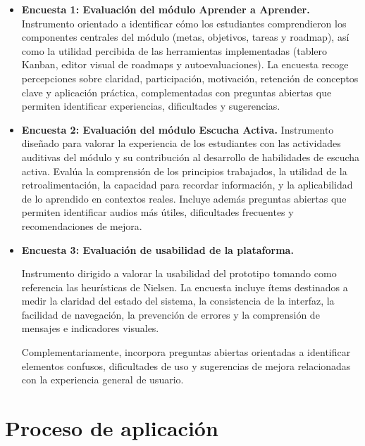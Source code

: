 \begin{itemize}
    \item \textbf{Encuesta 1: Evaluación del módulo Aprender a Aprender.}  
    Instrumento orientado a identificar cómo los estudiantes comprendieron los componentes centrales del módulo (metas, objetivos, tareas y roadmap), así como la utilidad percibida de las herramientas implementadas (tablero Kanban, editor visual de roadmaps y autoevaluaciones).
    La encuesta recoge percepciones sobre claridad, participación, motivación, retención de conceptos clave y aplicación práctica, complementadas con preguntas abiertas que permiten identificar experiencias, dificultades y sugerencias.


    \item \textbf{Encuesta 2: Evaluación del módulo Escucha Activa.}  
    Instrumento diseñado para valorar la experiencia de los estudiantes con las actividades auditivas del módulo y su contribución al desarrollo de habilidades de escucha activa.
    Evalúa la comprensión de los principios trabajados, la utilidad de la retroalimentación, la capacidad para recordar información, y la aplicabilidad de lo aprendido en contextos reales.
    Incluye además preguntas abiertas que permiten identificar audios más útiles, dificultades frecuentes y recomendaciones de mejora.


    \item \textbf{Encuesta 3: Evaluación de usabilidad de la plataforma.}  
    
    Instrumento dirigido a valorar la usabilidad del prototipo tomando como referencia las heurísticas de Nielsen. La encuesta incluye ítems destinados a medir la claridad del estado del sistema, la consistencia de la interfaz, la facilidad de navegación, la prevención de errores y la comprensión de mensajes e indicadores visuales. 
    
    Complementariamente, incorpora preguntas abiertas orientadas a identificar elementos confusos, dificultades de uso y sugerencias de mejora relacionadas con la experiencia general de usuario.

\end{itemize}

\section{Proceso de aplicación}

